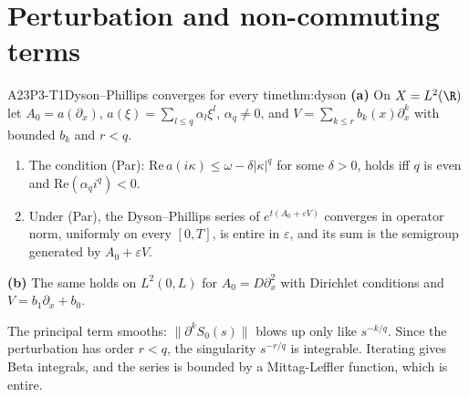 \section{Perturbation and non-commuting terms}

\begin{dimcard}{A23}{P3-T1}{Dyson--Phillips converges for every time}{\proved}{thm:dyson}
\textbf{(a)} On $X=L^2(\R)$ let $A_0=a(\partial_x)$, $a(\xi)=\sum_{l\le q}\alpha_l\xi^l$, $\alpha_q\ne0$, and $V=\sum_{k\le r}b_k(x)\partial_x^k$ with bounded $b_k$ and $r<q$.
\begin{enumerate}[label=(a\arabic*)]
\item The condition (Par): $\mathrm{Re}\,a(i\kappa)\le\omega-\delta|\kappa|^q$ for some $\delta>0$, holds iff $q$ is even and $\mathrm{Re}(\alpha_qi^q)<0$.
\item Under (Par), the Dyson--Phillips series of $e^{t(A_0+\varepsilon V)}$ converges in operator norm, uniformly on every $[0,T]$, is entire in $\varepsilon$, and its sum is the semigroup generated by $A_0+\varepsilon V$.
\end{enumerate}
\textbf{(b)} The same holds on $L^2(0,L)$ for $A_0=D\partial_x^2$ with Dirichlet conditions and $V=b_1\partial_x+b_0$.
\end{dimcard}

\begin{proofidea}
The principal term smooths: $\|\partial^kS_0(s)\|$ blows up only like $s^{-k/q}$. Since the perturbation has order $r<q$, the singularity $s^{-r/q}$ is integrable. Iterating gives Beta integrals, and the series is bounded by a Mittag-Leffler function, which is entire.
\end{proofidea}

